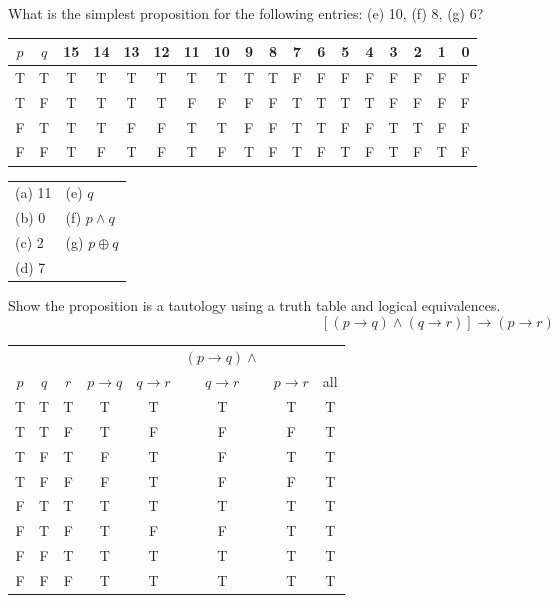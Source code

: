 \documentclass[12pt,addpoints]{exam}
\begin{document}
\begin{questions}
 What is the simplest proposition for the following entries: (e) 10, (f) 8, (g) 6? \\
 \begin{tabular}{cc|cccc|cccc|cccc|cccc}
    $p$ & $q$ & 15 & 14 & 13 & 12 & 11 & 10 & 9 & 8 & 7 & 6 & 5 & 4 & 3 & 2 & 1 & 0 \\
    \hline
    T & T & T & T & T & T & T & T & T & T & F & F & F & F & F & F & F & F \\
    T & F & T & T & T & T & F & F & F & F & T & T & T & T & F & F & F & F \\
    F & T & T & T & F & F & T & T & F & F & T & T & F & F & T & T & F & F \\
    F & F & T & F & T & F & T & F & T & F & T & F & T & F & T & F & T & F \\
 \end{tabular}
	\begin{solution}
    \begin{tabular}{|ll|}
    \hline
    (a) 11 \hspace{1in}     & (e) $q$ \\
    (b) 0                   & (f) $p \wedge q$ \\
    (c) 2                   & (g) $p \oplus q$\\
    (d) 7 & \\
    \hline
    \end{tabular}
    \end{solution}

\question Show the proposition is a tautology using a truth table
and logical equivalences.
 $$[(p \rightarrow q) \wedge (q \rightarrow r)] \rightarrow (p \rightarrow r)$$
	\begin{solution}

    \begin{tabular}{ccc|ccccc}
         &     &     &          &                          & $(p
         \rightarrow q) \wedge$ & \\
     $p$ & $q$ & $r$ & $p \rightarrow q$ & $q \rightarrow r$ &
     $q \rightarrow r$ & $p \rightarrow r$ &  all \\
     \hline
     T & T & T & T & T & T & T & T\\
     T & T & F & T & F & F & F & T\\
     T & F & T & F & T & F & T & T\\
     T & F & F & F & T & F & F & T\\
     F & T & T & T & T & T & T & T\\
     F & T & F & T & F & F & T & T\\
     F & F & T & T & T & T & T & T\\
     F & F & F & T & T & T & T & T\\
   \end{tabular}


\end{solution}
\end{questions}
\end{document}
